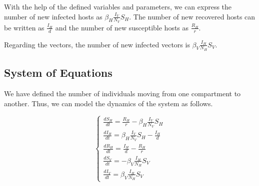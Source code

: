 With the help of the defined variables and parameters, we can express the number of new infected hosts as $\beta_H \frac{I_V}{N_V} S_H$. The number of new recovered hosts can be written as $\frac{I_H}{d}$ and the number of new susceptible hosts as $\frac{R_H}{r}$.

Regarding the vectors, the number of new infected vectors is $\beta_V \frac{I_H}{N_H} S_V$.

\subsection*{System of Equations}

We have defined the number of individuals moving from one compartment to another. Thus, we can model the dynamics of the system as follows.

\begin{equation}
\begin{cases}
    {\frac{dS_H}{dt} = \frac{R_H}{r} - \beta_H \frac{I_V}{N_V} S_H}\\
    {\frac{dI_H}{dt} = \beta_H \frac{I_V}{N_V} S_H - \frac{I_H}{d}}\\
    {\frac{dR_H}{dt} = \frac{I_H}{d} - \frac{R_H}{r}}\\
    {\frac{dS_V}{dt} = -\beta_V \frac{I_H}{N_H} S_V}\\
    {\frac{dI_V}{dt} = \beta_V \frac{I_H}{N_H} S_V}
\end{cases}
\end{equation}